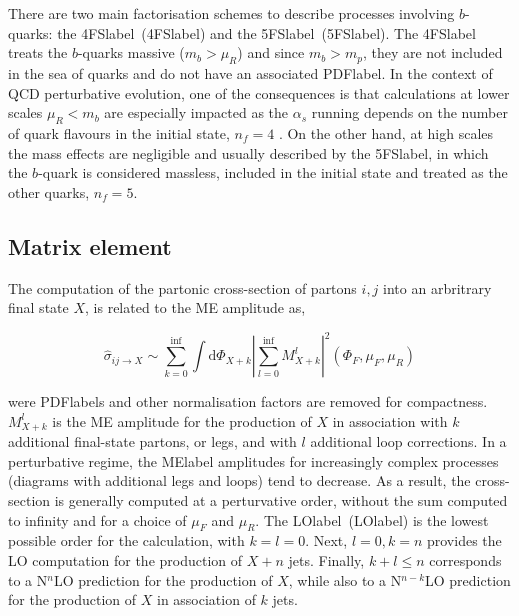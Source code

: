  There are two main factorisation schemes to describe processes involving $b$-quarks: the \acrlong{4FSlabel}~(\acrshort{4FSlabel}) and the \acrlong{5FSlabel}~(\acrshort{5FSlabel}). The \acrshort{4FSlabel} treats the $b$-quarks massive ($m_b>\mu_R$) and since $m_b>m_p$, they are not included in the sea of quarks and do not have an associated \acrshort{PDFlabel}. In the context of \acrshort{QCD} perturbative evolution, one of the consequences is that calculations at lower scales $\mu_R<m_b$ are especially impacted as the $\alpha_s$ running depends on the number of quark flavours in the initial state, $n_f=4$ . On the other hand, at high scales the mass effects are negligible and usually described by the \acrshort{5FSlabel}, in which the $b$-quark is considered massless, included in the initial state and treated as the other quarks, $n_f=5$. 

\subsection{Matrix element}

The computation of the partonic cross-section of partons $i,j$ into an arbritrary final state $X$, is related to the \acrshort{ME} amplitude as,

\begin{equation}
    \hat{\sigma}_{ij\to X} \sim \sum_{k=0}^\inf \int \text{d}\Phi_{X+k}\left|\sum_{l=0}^\inf M^l_{X+k}\right|^2(\Phi_F,\mu_F,\mu_R)
\end{equation}

were \acrshort{PDFlabel}s and other normalisation factors are removed for compactness. $M^l_{X+k}$ is the \acrshort{ME} amplitude for the production of $X$ in association with $k$ additional final-state partons, or legs, and with $l$ additional loop corrections. In a perturbative regime, the \acrshort{MElabel} amplitudes for increasingly complex processes (diagrams with additional legs and loops) tend to decrease. As a result, the cross-section is generally computed at a perturvative order, without the sum computed to infinity and for a choice of $\mu_F$ and $\mu_R$. The \acrlong{LOlabel}~(\acrshort{LOlabel}) is the lowest possible order for the calculation, with $k=l=0$. Next, $l=0,k=n$ provides the \acrshort{LO} computation for the production of $X+n$ jets. Finally, $k+l\leq n$ corresponds to a N$^n$LO prediction for the production of $X$, while also to a N$^{n-k}$LO prediction for the production of $X$ in association of $k$ jets.

